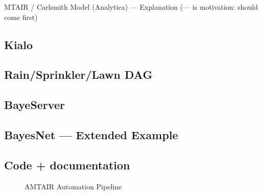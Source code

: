 \documentclass[
  letterpaper,
]{book}
\begin{document}
MTAIR / Carlsmith Model (Analytica) --- Explanation (--- is motivation:
should come first)

\subsection{Kialo}\label{kialo}

\subsection{Rain/Sprinkler/Lawn DAG}\label{rainsprinklerlawn-dag}

\subsection{BayeServer}\label{bayeserver}

\subsection{BayesNet --- Extended
Example}\label{bayesnet-extended-example}

\subsection{Code + documentation}\label{code-documentation}

\begin{figure}


\caption[Five-step AMTAIR automation pipeline from PDFs to Bayesian
networks]{\label{fig-automation_pipeline}AMTAIR Automation Pipeline}

\end{figure}%
\end{document}
